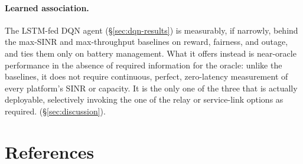 \documentclass[]{ieeeaccess}
\begin{document}
\paragraph{Learned association.} The LSTM-fed DQN agent (\S\ref{sec:dqn-results}) is
measurably, if narrowly, behind the max-SINR and max-throughput baselines on reward,
fairness, and outage, and ties them only on battery management. What it offers
instead is near-oracle performance in the absence of required information for the oracle: unlike the
baselines, it does not require continuous, perfect, zero-latency measurement of
every platform's SINR or capacity. It is the only one of the three that is
actually deployable, selectively invoking the one of the relay or service-link options as required.
(\S\ref{sec:discussion}).

\section{References}


\EOD
\end{document}

